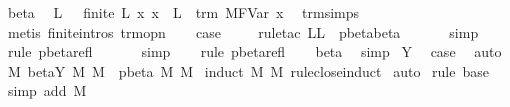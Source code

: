 \begin{isabellebody}
\ beta{\isacharparenleft}{}{\isacharparenright}\ \isamarkupfalse%
\ L\ \ {}{\isacharcolon}\ {\isachardoublequoteopen}finite\ L{\isachardoublequoteclose}\ {\isachardoublequoteopen}{\isasymforall}x{\isachardot}\ x\ {\isasymnotin}\ L\ {\isasymlongrightarrow}\ trm\ {\isacharparenleft}M{\isacharcircum}FVar\ x{\isacharparenright}{\isachardoublequoteclose}\ \isamarkupfalse%
\ trm{\isachardot}simps\ \isamarkupfalse%
\ {\isacharparenleft}metis\ finite{\isachardot}intros{\isacharparenleft}{}{\isacharparenright}\ trm{\isacharunderscore}opn{\isacharparenright}\isanewline
\ \ \isamarkupfalse%
\ {\isacharquery}case\ \isanewline
\ \ \isamarkupfalse%
\ {\isacharparenleft}rule{\isacharunderscore}tac\ L{\isacharequal}L\ \ pbeta{\isachardot}beta{\isacharparenright}\isanewline
\ \ \isamarkupfalse%
\ {}\ \isamarkupfalse%
\ simp\isanewline
\ \ \isamarkupfalse%
\ {\isacharparenleft}rule\ pbeta{\isacharunderscore}refl{\isacharparenright}\isanewline
\ \ \isamarkupfalse%
\ {}\ \isamarkupfalse%
\ simp\isanewline
\ \ \isamarkupfalse%
\ {\isacharparenleft}rule\ pbeta{\isacharunderscore}refl{\isacharparenright}\isanewline
\ \ \isamarkupfalse%
\ beta\ \isamarkupfalse%
\ simp\isanewline
{}\isamarkupfalse%
\isanewline
{}\isamarkupfalse%
\ Y\ \isamarkupfalse%
\ {\isacharquery}case\ \isamarkupfalse%
\ auto\isanewline
{}\isamarkupfalse%
%
\endisatagproof
{\isafoldproof}%
%
\isadelimproof
\isanewline
%
\endisadelimproof
\isanewline
{}\isamarkupfalse%
\ M{}{\isacharcolon}\ {\isachardoublequoteopen}beta{\isacharunderscore}Y{\isacharasterisk}\ M\ M{\isacharprime}\ {\isasymLongrightarrow}\ pbeta{\isacharasterisk}\ M\ M{\isacharprime}{\isachardoublequoteclose}\isanewline
%
\isadelimproof
%
\endisadelimproof
%
\isatagproof
{}\isamarkupfalse%
\ {\isacharparenleft}induct\ M\ M{\isacharprime}\ rule{\isacharcolon}close{\isachardot}induct{\isacharparenright}\isanewline
{}\isamarkupfalse%
\ auto\isanewline
{}\isamarkupfalse%
\ {\isacharparenleft}rule\ base{\isacharparenright}\isanewline
{}\isamarkupfalse%
\ {\isacharparenleft}simp\ add{\isacharcolon}\ M{}{\isacharprime}{\isacharparenright}%
\endisatagproof
{\isafoldproof}%

\end{isabellebody}
